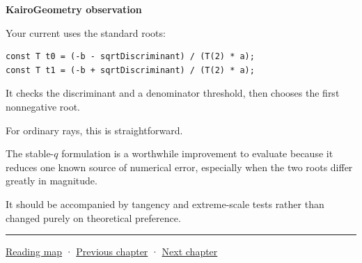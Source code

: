 \textbf{KairoGeometry observation}

Your current  uses the standard roots:

\begin{verbatim}
const T t0 = (-b - sqrtDiscriminant) / (T(2) * a);
const T t1 = (-b + sqrtDiscriminant) / (T(2) * a);
\end{verbatim}

It checks the discriminant and a denominator threshold, then chooses the first nonnegative root.

For ordinary rays, this is straightforward.

The stable-\(q\) formulation is a worthwhile improvement to evaluate because it reduces one known source of numerical error, especially when the two roots differ greatly in magnitude.

It should be accompanied by tangency and extreme-scale tests rather than changed purely on theoretical preference.

\begin{center}\rule{0.5\linewidth}{0.5pt}\end{center}

\hyperref[volume-reading-map]{Reading map} · \hyperref[04-visual-computing-ii-ch022-convex-support-mapping-and-distance]{Previous chapter} · \hyperref[04-visual-computing-ii-ch024-raytriangle-intersection]{Next chapter}
